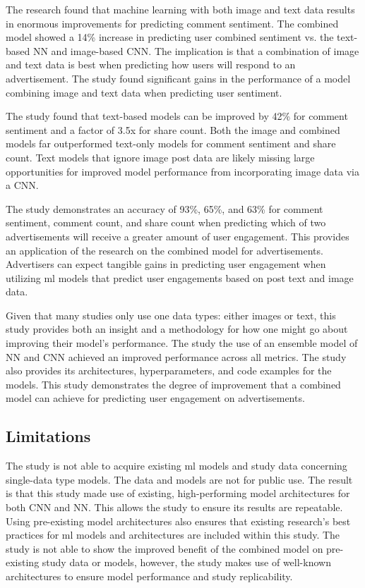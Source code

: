 \documentclass[mksc,blindrev]{informs3} %
\begin{document}
The research found that machine learning with both image and text data results in enormous improvements for predicting comment sentiment. The combined model showed a 14\% increase in predicting user combined sentiment vs. the text-based NN and image-based CNN. The implication is that a combination of image and text data is best when predicting how users will respond to an advertisement. The study found significant gains in the performance of a model combining image and text data when predicting user sentiment.

The study found that text-based models can be improved by 42\% for comment sentiment and a factor of 3.5x for share count. Both the image and combined models far outperformed text-only models for comment sentiment and share count. Text models that ignore image post data are likely missing large opportunities for improved model performance from incorporating image data via a CNN. 

The study demonstrates an accuracy of 93\%, 65\%, and 63\% for comment sentiment, comment count, and share count when predicting which of two advertisements will receive a greater amount of user engagement. This provides an application of the research on the combined model for advertisements. Advertisers can expect tangible gains in predicting user engagement when utilizing ml models that predict user engagements based on post text and image data. 

Given that many studies only use one data types: either images or text, this study provides both an insight and a methodology for how one might go about improving their model's performance. The study the use of an ensemble model of NN and CNN achieved an improved performance across all metrics. The study also provides its architectures, hyperparameters, and code examples for the models. This study demonstrates the degree of improvement that a combined model can achieve for predicting user engagement on advertisements.

\subsection{Limitations}

The study is not able to acquire existing ml models and study data concerning single-data type models. The data and models are not for public use. The result is that this study made use of existing, high-performing model architectures for both CNN and NN. This allows the study to ensure its results are repeatable. Using pre-existing model architectures also ensures that existing research's best practices for ml models and architectures are included within this study. The study is not able to show the improved benefit of the combined model on pre-existing study data or models, however, the study makes use of well-known architectures to ensure model performance and study replicability. 
\end{document}
